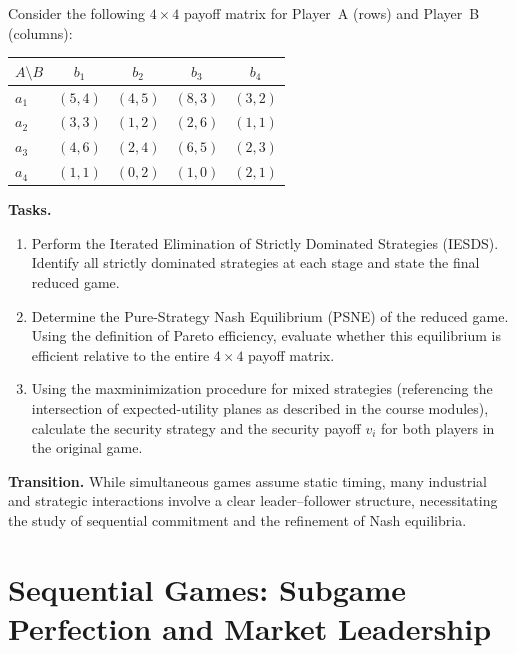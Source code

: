 \documentclass[12pt,a4paper]{article}
\begin{document}
Consider the following \(4 \times 4\) payoff matrix for Player~A (rows) and Player~B (columns):

\begin{table}[h!]
  \centering
  \renewcommand{\arraystretch}{1.1}
  \begin{tabular}{lcccc}
    \toprule
    $A \setminus B$ & $b_1$ & $b_2$ & $b_3$ & $b_4$ \\
    \midrule
    $a_1$ & $(5,4)$ & $(4,5)$ & $(8,3)$ & $(3,2)$ \\
    $a_2$ & $(3,3)$ & $(1,2)$ & $(2,6)$ & $(1,1)$ \\
    $a_3$ & $(4,6)$ & $(2,4)$ & $(6,5)$ & $(2,3)$ \\
    $a_4$ & $(1,1)$ & $(0,2)$ & $(1,0)$ & $(2,1)$ \\
    \bottomrule
  \end{tabular}
\end{table}

\noindent\textbf{Tasks.}
\begin{enumerate}
  \item Perform the Iterated Elimination of Strictly Dominated Strategies (IESDS).
        Identify all strictly dominated strategies at each stage and state the final reduced game.
  \item Determine the Pure-Strategy Nash Equilibrium (PSNE) of the reduced game. Using the
        definition of Pareto efficiency, evaluate whether this equilibrium is efficient relative
        to the entire \(4 \times 4\) payoff matrix.
  \item Using the maxminimization procedure for mixed strategies (referencing the intersection
        of expected-utility planes as described in the course modules), calculate the security
        strategy and the security payoff \(v_i\) for both players in the original game.
\end{enumerate}

\bigskip
\noindent\textbf{Transition.}
While simultaneous games assume static timing, many industrial and strategic interactions involve
a clear leader--follower structure, necessitating the study of sequential commitment and the
refinement of Nash equilibria.

\bigskip
\noindent\hrulefill
\bigskip


\section{Sequential Games: Subgame Perfection and Market Leadership}
\end{document}
